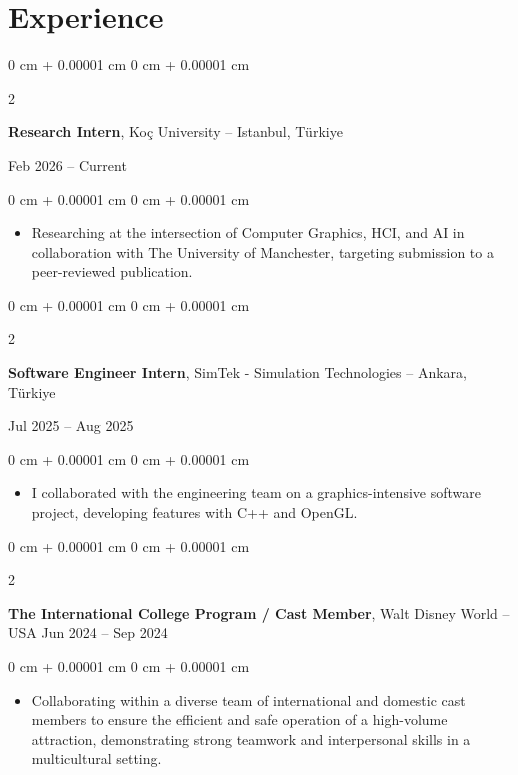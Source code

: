 \documentclass[10pt, letterpaper]{article}
\newenvironment{highlights}{
    \begin{itemize}[
        topsep=0.10 cm,
        parsep=0.10 cm,
        partopsep=0pt,
        itemsep=0pt,
        leftmargin=0 cm + 10pt
    ]
}{
    \end{itemize}
} %
\newenvironment{onecolentry}{
    \begin{adjustwidth}{
        0 cm + 0.00001 cm
    }{
        0 cm + 0.00001 cm
    }
}{
    \end{adjustwidth}
} %
\newenvironment{twocolentry}[2][]{
    \onecolentry
    \def\secondColumn{#2}
    \setcolumnwidth{\fill, 4.5 cm}
    \begin{paracol}{2}
}{
    \switchcolumn \raggedleft \secondColumn
    \end{paracol}
    \endonecolentry
} %
\begin{document}
    \section{Experience}
    \begin{twocolentry}{
            Feb 2026 – Current
        }
            \textbf{Research Intern}, Koç University -- Istanbul, Türkiye
        \end{twocolentry}
        \vspace{0.10 cm}
        \begin{onecolentry}
            \begin{highlights}
                \item  Researching at the intersection of Computer Graphics, HCI, and AI in collaboration with The University of Manchester, targeting submission to a peer-reviewed publication.
            \end{highlights}
        \end{onecolentry}
           \vspace{0.10 cm} 
        \begin{twocolentry}{
            Jul 2025 – Aug 2025
        }
            \textbf{Software Engineer Intern}, SimTek - Simulation Technologies -- Ankara, Türkiye
        \end{twocolentry}
        \vspace{0.10 cm}
        \begin{onecolentry}
            \begin{highlights}
                \item  I collaborated with the engineering team on a graphics-intensive software project, developing features with C++ and OpenGL.
            \end{highlights}
        \end{onecolentry}
           \vspace{0.10 cm} 
        \begin{twocolentry}{
            Jun 2024 – Sep 2024
        }
            \textbf{The International College Program / Cast Member}, Walt Disney World -- USA\end{twocolentry}

        \vspace{0.10 cm}
        \begin{onecolentry}
            \begin{highlights}
                \item  Collaborating within a diverse team of international and domestic cast members to ensure the efficient and safe operation of a high-volume attraction, demonstrating strong teamwork and interpersonal skills in a multicultural setting.
            \end{highlights}
        \end{onecolentry}
                
\end{document}
